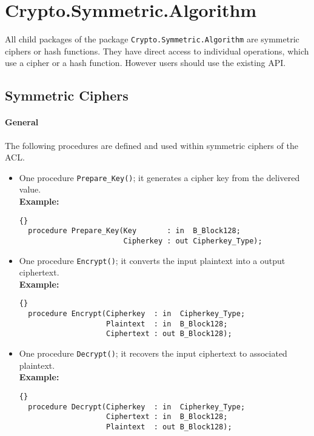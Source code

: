 \chapter{Crypto.Symmetric.Algorithm}\label{Algorithm}
All child packages of the package \texttt{Crypto.Symmetric.Algorithm}
are symmetric ciphers or hash functions. They have direct access to
individual operations, which use a cipher or a hash function. However
users should use the existing API.


\section{Symmetric Ciphers}
\subsubsection*{General}
The following procedures are defined and used within symmetric ciphers
of the ACL.
\begin{itemize}
\item One procedure \texttt{Prepare\_Key()}; it generates a cipher key
  from the delivered value.\\ \textbf{Example:}
\begin{lstlisting}{}
  procedure Prepare_Key(Key       : in  B_Block128;
                        Cipherkey : out Cipherkey_Type);
\end{lstlisting}
\item One procedure \texttt{Encrypt()}; it converts the input
  plaintext into a output ciphertext.\\

\noindent\textbf{Example:}
\begin{lstlisting}{}
  procedure Encrypt(Cipherkey  : in  Cipherkey_Type;
                    Plaintext  : in  B_Block128;
                    Ciphertext : out B_Block128);
\end{lstlisting}
\item One procedure \texttt{Decrypt()}; it recovers the input
 ciphertext to associated plaintext.\\

\noindent\textbf{Example:}
\begin{lstlisting}{}
  procedure Decrypt(Cipherkey  : in  Cipherkey_Type;
                    Ciphertext : in  B_Block128;
                    Plaintext  : out B_Block128);
\end{lstlisting}
\end{itemize}

